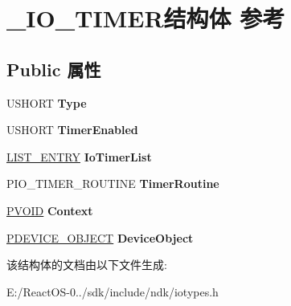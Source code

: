\hypertarget{struct___i_o___t_i_m_e_r}{}\section{\+\_\+\+I\+O\+\_\+\+T\+I\+M\+E\+R结构体 参考}
\label{struct___i_o___t_i_m_e_r}
\subsection*{Public 属性}
\begin{DoxyCompactItemize}
\item 
\mbox{\label{struct___i_o___t_i_m_e_r_a17a9f06e38b0c320e485f598ce1710a0}} 
U\+S\+H\+O\+RT {\bfseries Type}
\item 
\mbox{\label{struct___i_o___t_i_m_e_r_ad62c1de5261db56d7eec10e624a8c084}} 
U\+S\+H\+O\+RT {\bfseries Timer\+Enabled}
\item 
\mbox{\label{struct___i_o___t_i_m_e_r_a1442260c67a51690ebba6cbfab8719a4}} 
\hyperlink{struct___l_i_s_t___e_n_t_r_y}{L\+I\+S\+T\+\_\+\+E\+N\+T\+RY} {\bfseries Io\+Timer\+List}
\item 
\mbox{\label{struct___i_o___t_i_m_e_r_a8aed93e60d5c98cc7adaa398143f8b5d}} 
P\+I\+O\+\_\+\+T\+I\+M\+E\+R\+\_\+\+R\+O\+U\+T\+I\+NE {\bfseries Timer\+Routine}
\item 
\mbox{\label{struct___i_o___t_i_m_e_r_a38b9e84073cb7c3f3b64e6589ceeae5b}} 
\hyperlink{interfacevoid}{P\+V\+O\+ID} {\bfseries Context}
\item 
\mbox{\label{struct___i_o___t_i_m_e_r_a37809273bb24258120392306147f58f0}} 
\hyperlink{struct___d_e_v_i_c_e___o_b_j_e_c_t}{P\+D\+E\+V\+I\+C\+E\+\_\+\+O\+B\+J\+E\+CT} {\bfseries Device\+Object}
\end{DoxyCompactItemize}


该结构体的文档由以下文件生成\+:\begin{DoxyCompactItemize}
\item 
E\+:/\+React\+O\+S-\/0../sdk/include/ndk/iotypes.\+h\end{DoxyCompactItemize}
